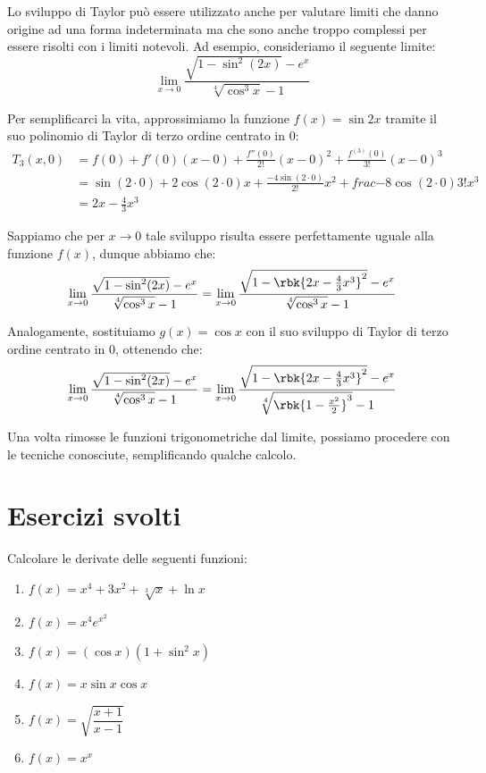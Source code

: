 \documentclass[a4paper, 12pt]{report}
\begin{document}
    Lo sviluppo di Taylor può essere utilizzato anche per valutare limiti che danno origine ad una forma indeterminata ma che sono anche troppo complessi per essere risolti con i limiti notevoli. Ad esempio, consideriamo il seguente limite:
    \[\lim_{x \to 0} \frac{\sqrt{1-\sin^2(2x)} - e^x}{\sqrt[4]{\cos^3 x}-1}\]

    Per semplificarci la vita, approssimiamo la funzione $f(x) = \sin 2x$ tramite il suo polinomio di Taylor di terzo ordine centrato in $0$:
    \[\begin{split}
        T_3(x, 0) &= f(0) + f'(0)(x-0) + \frac{f''(0)}{2!}(x-0)^2 + \frac{f^{(3)}(0)}{3!}(x-0)^3\\
        &= \sin(2 \cdot 0) + 2\cos(2 \cdot 0)x + \frac{-4 \sin(2 \cdot 0)}{2!}x^2 + frac{-8 \cos(2 \cdot 0)}{3!}x^3 \\
        &= 2x - \frac{4}{3}x^3
    \end{split}\]

    Sappiamo che per $x \to 0$ tale sviluppo risulta essere perfettamente uguale alla funzione $f(x)$, dunque abbiamo che:
    \[\lim_{x \to 0} \frac{\sqrt{1-\sin^2(2x)} - e^x}{\sqrt[4]{\cos^3 x}-1} = \lim_{x \to 0} \frac{\sqrt{1-\rbk{2x - \frac{4}{3}x^3}^2} - e^x}{\sqrt[4]{\cos^3 x}-1}\]

    Analogamente, sostituiamo $g(x) = \cos x$ con il suo sviluppo di Taylor di terzo ordine centrato in $0$, ottenendo che:
    \[\lim_{x \to 0} \frac{\sqrt{1-\sin^2(2x)} - e^x}{\sqrt[4]{\cos^3 x}-1} = \lim_{x \to 0} \frac{\sqrt{1-\rbk{2x - \frac{4}{3}x^3}^2} - e^x}{\sqrt[4]{\rbk{1-\frac{x^2}{2}}^3}-1}\]

    Una volta rimosse le funzioni trigonometriche dal limite, possiamo procedere con le tecniche conosciute, semplificando qualche calcolo.

    \newpage

    \section{Esercizi svolti}

    \begin{framedprob}{}
        Calcolare le derivate delle seguenti funzioni:
        \begin{enumerate}
            \item $f(x) = x^4+3x^2+\sqrt[3]{x} +\ln x$
            \item $f(x) = x^4 e^{x^2}$
            \item $f(x) = (\cos x)(1+\sin^2 x)$
            \item $f(x) = x \sin x \cos x$
            \item $f(x) = \sqrt{\dfrac{x+1}{x-1}}$
            \item $f(x) = x^x$
        \end{enumerate}
    \end{framedprob}
\end{document}
